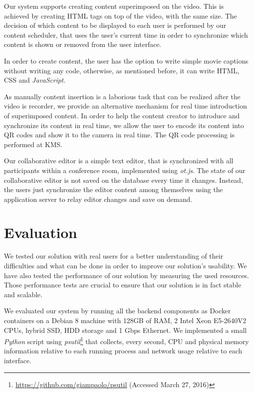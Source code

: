 \documentclass[10pt,conference]{IEEEtran}
\begin{document}
Our system supports creating content superimposed on the video.
This is achieved by creating \gls{HTML} tags on top of the video, with the same size.
The decision of which content to be displayed to each user is performed by our content scheduler, that uses the user's current time in order to synchronize which content is shown or removed from the user interface.

In order to create content, the user has the option to write simple movie captions without writing any code, otherwise, as mentioned before, it can write \gls{HTML}, \gls{CSS} and \emph{JavaScript}.

As manually content insertion is a laborious task that can be realized after the video is recorder, we provide an alternative mechanism for real time introduction of superimposed content.
In order to help the content creator to introduce and synchronize its content in real time, we allow the user to encode its content into \gls{QR} codes and show it to the camera in real time.
The \gls{QR} code processing is performed at \gls{KMS}.


Our collaborative editor is a simple text editor, that is synchronized with all participants within a conference room, implemented using \emph{ot.js}.
The state of our collaborative editor is not saved on the database every time it changes.
Instead, the users just synchronize the editor content among themselves using the application server to relay editor changes and save on demand.















\section{Evaluation}
\label{chapter:evaluation}


We tested our solution with real users for a better understanding of their difficulties and what can be done in order to improve our solution's usability.
We have also tested the performance of our solution by measuring the used resources.
Those performance tests are crucial to ensure that our solution is in fact stable and scalable.

We evaluated our system by running all the backend components as Docker containers on a Debian 8 machine with 128GB of RAM, 2 Intel Xeon E5-2640V2 CPUs, hybrid SSD, HDD storage and 1 Gbps Ethernet. 
We implemented a small \emph{Python} script using \emph{psutil}\footnote{\url{https://github.com/giampaolo/psutil} (Accessed March 27, 2016)} that collects, every second, CPU and physical memory information relative to each running process and network usage relative to each interface. 
\end{document}
